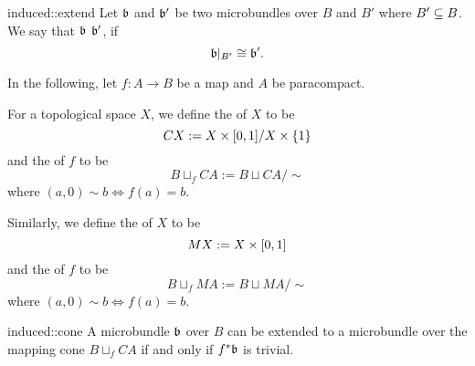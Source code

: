 \begin{mydefinition}{induced::extend}
    Let $\mathfrak{b}$ and $\mathfrak{b}'$ be two microbundles over $B$ and $B'$ where $B' \subseteq{} B$.
    We say that $\mathfrak{b}$  $\mathfrak{b}'$, if
    \[ \mathfrak{b}\vert_{B'} \cong \mathfrak{b}'. \]
\end{mydefinition}

\begin{myparagraph}
    In the following, let $f: A \to B$ be a map and $A$ be paracompact.
    
    For a topological space $X$, we define the  of $X$ to be 
    \[ CX := X \times [0, 1] / X \times \{1\} \]
    and the  of $f$ to be
    \[ B \sqcup_f CA := B \sqcup CA / \sim \]
    where $(a, 0) \sim b \iff f(a) = b$.
    
    Similarly, we define the  of $X$ to be
    \[ MX := X \times [0, 1] \]
    and the  of $f$ to be
    \[ B \sqcup_f MA := B \sqcup MA / \sim \]
    where $(a, 0) \sim b \iff f(a) = b$.
\end{myparagraph}

\begin{mylemma}{induced::cone}
    A microbundle $\mathfrak{b}$ over $B$ can be extended to a microbundle over the mapping cone $B \sqcup_f CA$ if and only if $f^*\mathfrak{b}$ is trivial.
\end{mylemma}

